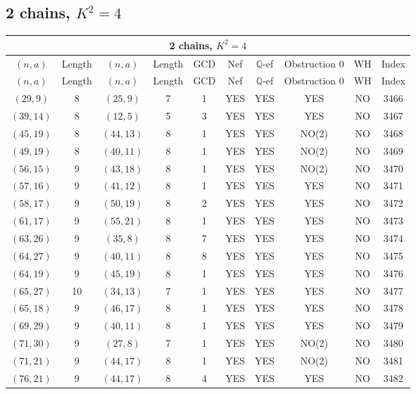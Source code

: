 \subsection{2 chains, $K^2 = 4$}
\begin{longtable}{|c|c|c|c|c|c|c|c|c|c|}
\hline
\multicolumn{10}{|c|}{2 chains, $K^2 = 4$}\\
\hline
$(n,a)$ & Length & $(n,a)$ & Length & GCD & Nef & $\mathbb Q$-ef & Obstruction 0 & WH & Index\\
\hline
\endfirsthead

\hline
$(n,a)$ & Length & $(n,a)$ & Length & GCD & Nef & $\mathbb Q$-ef & Obstruction 0 & WH & Index\\
\hline
\endhead
\hline
\endfoot

$(29, 9)$ & 8 & $(25, 9)$ & 7 & 1 & YES & YES & YES & NO & 3466\\
$(39, 14)$ & 8 & $(12, 5)$ & 5 & 3 & YES & YES & YES & NO & 3467\\
$(45, 19)$ & 8 & $(44, 13)$ & 8 & 1 & YES & YES & NO(2) & NO & 3468\\
$(49, 19)$ & 8 & $(40, 11)$ & 8 & 1 & YES & YES & NO(2) & NO & 3469\\
$(56, 15)$ & 9 & $(43, 18)$ & 8 & 1 & YES & YES & NO(2) & NO & 3470\\
$(57, 16)$ & 9 & $(41, 12)$ & 8 & 1 & YES & YES & YES & NO & 3471\\
$(58, 17)$ & 9 & $(50, 19)$ & 8 & 2 & YES & YES & YES & NO & 3472\\
$(61, 17)$ & 9 & $(55, 21)$ & 8 & 1 & YES & YES & YES & NO & 3473\\
$(63, 26)$ & 9 & $(35, 8)$ & 8 & 7 & YES & YES & YES & NO & 3474\\
$(64, 27)$ & 9 & $(40, 11)$ & 8 & 8 & YES & YES & YES & NO & 3475\\
$(64, 19)$ & 9 & $(45, 19)$ & 8 & 1 & YES & YES & YES & NO & 3476\\
$(65, 27)$ & 10 & $(34, 13)$ & 7 & 1 & YES & YES & YES & NO & 3477\\
$(65, 18)$ & 9 & $(46, 17)$ & 8 & 1 & YES & YES & YES & NO & 3478\\
$(69, 29)$ & 9 & $(40, 11)$ & 8 & 1 & YES & YES & YES & NO & 3479\\
$(71, 30)$ & 9 & $(27, 8)$ & 7 & 1 & YES & YES & NO(2) & NO & 3480\\
$(71, 21)$ & 9 & $(44, 17)$ & 8 & 1 & YES & YES & NO(2) & NO & 3481\\
$(76, 21)$ & 9 & $(44, 17)$ & 8 & 4 & YES & YES & YES & NO & 3482\\

\end{longtable}
